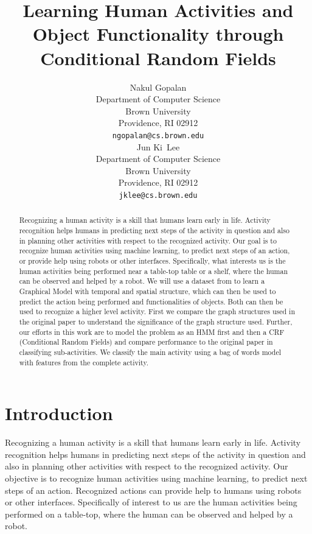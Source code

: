 \documentclass{article} %
\title{Learning Human Activities and Object Functionality through Conditional Random Fields}
\author{
Nakul Gopalan\\
Department of Computer Science\\
Brown University\\
Providence, RI 02912 \\
\texttt{ngopalan@cs.brown.edu} \\
\And
Jun Ki~Lee\\
Department of Computer Science\\
Brown University\\
Providence, RI 02912 \\
\texttt{jklee@cs.brown.edu} \\
}
\begin{document}
\maketitle

\begin{abstract}
Recognizing a human activity is a skill that humans learn early in life. Activity recognition helps humans in predicting next steps of the activity in question and also in planning other activities with respect to the recognized activity. Our goal is to recognize human activities using machine learning, to predict next steps of an action, or provide help using robots or other interfaces. Specifically, what interests us is the human activities being performed near a table-top table or a shelf, where the human can be observed and helped by a robot. We will use a dataset from \cite{koppula2013detectingactivitiesrgbd} to learn a Graphical Model with temporal and spatial structure, which can then be used to predict the action being performed and functionalities of objects. Both can then be used to recognize a higher level activity. First we compare the graph structures used in the original paper to understand the significance of the graph structure used. Further, our efforts in this work are to model the problem as an HMM first and then a CRF (Conditional Random Fields) and compare performance to the original paper in classifying sub-activities. We classify the main activity using a bag of words model with features from the complete activity. 
\end{abstract}

\section{Introduction}
Recognizing a human activity is a skill that humans learn early in life. Activity recognition helps humans in predicting next steps of the activity in question and also in planning other activities with respect to the recognized activity. Our objective is to recognize human activities using machine learning, to predict next steps of an action. Recognized actions can provide help to humans using robots or other interfaces. Specifically of interest to us are the human activities being performed on a table-top, where the human can be observed and helped by a robot.
\end{document}
